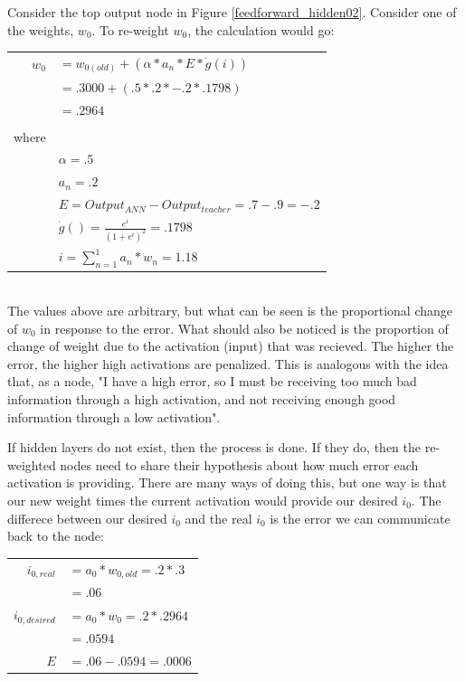 \documentclass[12pt]{article}
\begin{document}
Consider the top output node in Figure \ref{feedforward_hidden02}. Consider one of the weights, $ w_0 $.
To re-weight $w_0$, the calculation would go: \\

	\begin{tabular}{r l}
		$w_{0}$		&	$ =  w_{0 ( old )} + ( \alpha * a_n * E * \dot g(i) )$	\\
					&	$ = .3000 + (.5 * .2 * -.2 * .1798)	$			\\
					&	$ = .2964 $							\\
					&										\\
		where		&										\\
					&	$ \alpha = .5 $ 		\\
					&	$ a_n = .2 $ \\
					&	$ E  = Output_{ANN} - Output_{teacher}  = .7 - .9 = -.2 $ \\
					&	$ \dot g() = \frac{e^{i}}{(1 + e^{i})^2}  = .1798$	\\
					&	$i  = \sum_{n=1}^1 a_n * w_n = 1.18$			\\
	\end{tabular} \\

The values above are arbitrary, but what can be seen is the proportional change of $w_0$ in response to the
error. What should also be noticed is the proportion of change of weight due to the activation (input) that was 
recieved. The higher the error, the higher high activations are penalized. This is analogous with the idea that, 
as a node, "I have a high error, so I must be receiving too much bad information through a high
activation, and not receiving enough good information through a low activation".

If hidden layers do not exist, then the process is done. If they do, then the re-weighted nodes need to 
share their hypothesis about how much error each activation is providing. There are many ways of doing this,
but one way is that our new weight times the current activation would provide our desired $i_{0}$. The 
differece between our desired $i_{0}$ and the real $i_{0}$ is the error we can communicate back to the node:
 
	\begin{tabular}{r l}
		$i_{0,real} $		&	$ = a_{0} * w_{0,old} = .2 * .3	$		\\
						&	$ = .06 $							\\
		$i_{0,desired} $		&	$ = a_{0} * w_{0}	= .2 * .2964$			\\
						&	$ = .0594 $						\\
		$ E $				&	$ = .06 - .0594 = .0006$				\\
	\end{tabular} \\
\end{document}
